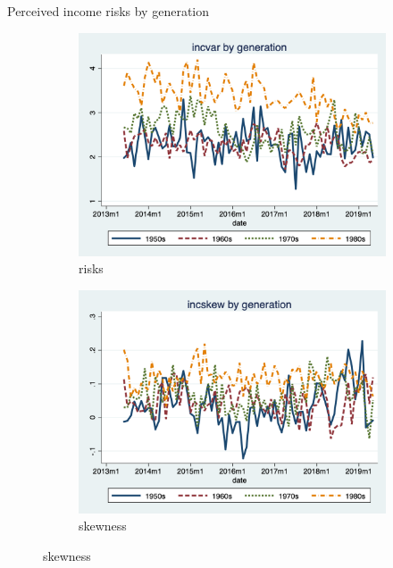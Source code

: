 \documentclass{beamer}
\begin{document}
\begin{frame}{Perceived income risks by generation}
	\begin{figure}[ht]
		\label{ts_incvar_byear_g_mean}
		\begin{subfigure}[b]{0.7\textwidth}
			\centering
			\caption{risks}
			\includegraphics[width=\textwidth, height = 0.33\textheight]{figures/ts_incvar_byear_g_mean.png}
		\end{subfigure}
		\begin{subfigure}[b]{0.7\textwidth}
			\caption{skewness}
			\includegraphics[width=\textwidth, height = 0.33\textheight]{figures/ts_incskew_byear_g_mean.png}
		\end{subfigure}
	\end{figure}
\end{frame}
\end{document}
